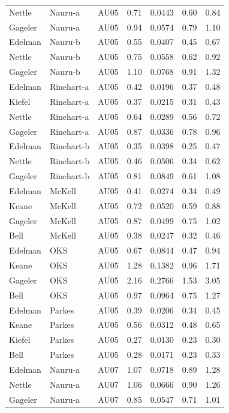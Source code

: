 \documentclass{monashthesis}
\begin{document}
\begin{center}
\begin{longtable}{lllllll}
Nettle & Nauru-a & AU05 & 0.71 & 0.0443 & 0.60 & 0.84 \\
Gageler & Nauru-a & AU05 & 0.94 & 0.0574 & 0.79 & 1.10 \\
Edelman & Nauru-b & AU05 & 0.55 & 0.0407 & 0.45 & 0.67 \\
Nettle & Nauru-b & AU05 & 0.75 & 0.0558 & 0.62 & 0.92 \\
Gageler & Nauru-b & AU05 & 1.10 & 0.0768 & 0.91 & 1.32 \\
Edelman & Rinehart-a & AU05 & 0.42 & 0.0196 & 0.37 & 0.48 \\
Kiefel & Rinehart-a & AU05 & 0.37 & 0.0215 & 0.31 & 0.43 \\
Nettle & Rinehart-a & AU05 & 0.64 & 0.0289 & 0.56 & 0.72 \\
Gageler & Rinehart-a & AU05 & 0.87 & 0.0336 & 0.78 & 0.96 \\
Edelman & Rinehart-b & AU05 & 0.35 & 0.0398 & 0.25 & 0.47 \\
Nettle & Rinehart-b & AU05 & 0.46 & 0.0506 & 0.34 & 0.62 \\
Gageler & Rinehart-b & AU05 & 0.81 & 0.0849 & 0.61 & 1.08 \\
Edelman & McKell & AU05 & 0.41 & 0.0274 & 0.34 & 0.49 \\
Keane & McKell & AU05 & 0.72 & 0.0520 & 0.59 & 0.88 \\
Gageler & McKell & AU05 & 0.87 & 0.0499 & 0.75 & 1.02 \\
Bell & McKell & AU05 & 0.38 & 0.0247 & 0.32 & 0.46 \\
Edelman & OKS & AU05 & 0.67 & 0.0844 & 0.47 & 0.94 \\
Keane & OKS & AU05 & 1.28 & 0.1382 & 0.96 & 1.71 \\
Gageler & OKS & AU05 & 2.16 & 0.2766 & 1.53 & 3.05 \\
Bell & OKS & AU05 & 0.97 & 0.0964 & 0.75 & 1.27 \\
Edelman & Parkes & AU05 & 0.39 & 0.0206 & 0.34 & 0.45 \\
Keane & Parkes & AU05 & 0.56 & 0.0312 & 0.48 & 0.65 \\
Kiefel & Parkes & AU05 & 0.27 & 0.0130 & 0.23 & 0.30 \\
Bell & Parkes & AU05 & 0.28 & 0.0171 & 0.23 & 0.33 \\
Edelman & Nauru-a & AU07 & 1.07 & 0.0718 & 0.89 & 1.28 \\
Nettle & Nauru-a & AU07 & 1.06 & 0.0666 & 0.90 & 1.26 \\
Gageler & Nauru-a & AU07 & 0.85 & 0.0547 & 0.71 & 1.01 \\

\end{longtable}
\end{center}
\end{document}
